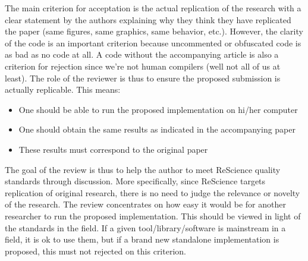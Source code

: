 \documentclass[a4paper,10pt, twocolumn]{article}
\begin{document}
The main criterion for acceptation is the actual replication of the research
with a clear statement by the authors explaining why they think they have
replicated the paper (same figures, same graphics, same behavior,
etc.). However, the clarity of the code is an important criterion because
uncommented or obfuscated code is as bad as no code at all. A code without the
accompanying article is also a criterion for rejection since we’re not human
compilers (well not all of us at least). The role of the reviewer is thus to
ensure the proposed submission is actually replicable. This means:
%
\begin{itemize}
\item One should be able to run the proposed implementation on hi/her computer
\item One should obtain the same results as indicated in the accompanying paper
\item These results must correspond to the original paper
\end{itemize}
%
The goal of the review is thus to help the author to meet ReScience quality
standards through discussion. More specifically, since ReScience targets
replication of original research, there is no need to judge the relevance or
novelty of the research. The review concentrates on how easy it would be for
another researcher to run the proposed implementation. This should be viewed in
light of the standards in the field. If a given tool/library/software is
mainstream in a field, it is ok to use them, but if a brand new standalone
implementation is proposed, this must not rejected on this criterion.



\end{document}
